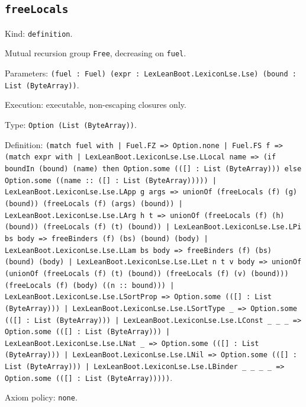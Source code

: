 \documentclass[11pt]{article}
\begin{document}
\subsection*{\texttt{freeLocals}}
\noindent Kind: \texttt{definition}.\par
\noindent Mutual recursion group \texttt{Free}, decreasing on \texttt{fuel}.\par
\noindent Parameters: \texttt{(fuel : Fuel) (expr : LexLeanBoot.LexiconLse.Lse) (bound : List (ByteArray))}.\par
\noindent Execution: executable, non-escaping closures only.\par
\noindent Type: \texttt{Option (List (ByteArray))}.\par
\noindent Definition: \texttt{(match fuel with | Fuel.FZ => Option.none | Fuel.FS f => (match expr with | LexLeanBoot.LexiconLse.Lse.LLocal name => (if boundIn (bound) (name) then Option.some (([] : List (ByteArray))) else Option.some ((name :: ([] : List (ByteArray))))) | LexLeanBoot.LexiconLse.Lse.LApp g args => unionOf (freeLocals (f) (g) (bound)) (freeLocals (f) (args) (bound)) | LexLeanBoot.LexiconLse.Lse.LArg h t => unionOf (freeLocals (f) (h) (bound)) (freeLocals (f) (t) (bound)) | LexLeanBoot.LexiconLse.Lse.LPi bs body => freeBinders (f) (bs) (bound) (body) | LexLeanBoot.LexiconLse.Lse.LLam bs body => freeBinders (f) (bs) (bound) (body) | LexLeanBoot.LexiconLse.Lse.LLet n t v body => unionOf (unionOf (freeLocals (f) (t) (bound)) (freeLocals (f) (v) (bound))) (freeLocals (f) (body) ((n :: bound))) | LexLeanBoot.LexiconLse.Lse.LSortProp => Option.some (([] : List (ByteArray))) | LexLeanBoot.LexiconLse.Lse.LSortType \_ => Option.some (([] : List (ByteArray))) | LexLeanBoot.LexiconLse.Lse.LConst \_ \_ \_ => Option.some (([] : List (ByteArray))) | LexLeanBoot.LexiconLse.Lse.LNat \_ => Option.some (([] : List (ByteArray))) | LexLeanBoot.LexiconLse.Lse.LNil => Option.some (([] : List (ByteArray))) | LexLeanBoot.LexiconLse.Lse.LBinder \_ \_ \_ \_ => Option.some (([] : List (ByteArray)))))}.\par
\noindent Axiom policy: \texttt{none}.\par
\end{document}

